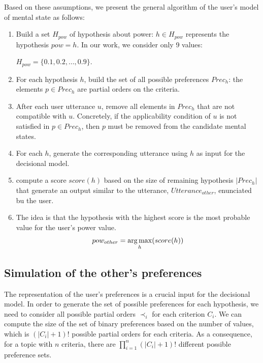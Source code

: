 \documentclass[conference, letterpaper]{IEEEtran}
\begin{document}
	Based on these assumptions, we present the general algorithm of the user's model of mental state as follows:
	\begin{enumerate}
		\item Build a set $H_{pow}$ of hypothesis about power: $h\in H_{pow}$ represents the hypothesis $pow=h$. In our work, we consider only 9 values: 
		
		$H_{pow}=\{0.1, 0.2, \ldots, 0.9\}$.
		\item For each hypothesis $h$, build the set of all possible preferences $Prec_h$: the elements $p\in Prec_h$ are partial orders on the criteria.
		\item After each user utterance $u$, remove all elements in $Prec_h$ that are not compatible with $u$. Concretely, if the applicability condition of $u$ is not satisfied in $p\in Prec_h$, then $p$ must be removed from the candidate mental states.
		\item For each $h$, generate the corresponding utterance using $h$ as input for the decisional model.
		\item compute a score $score(h)$ based on the size of remaining hypothesis $|Prec_h|$ that generate an output similar to the utterance, $Utterance_{other}$, enunciated bu the user. 
		\item 	The idea is that the hypothesis with the highest score is the most probable value for the user's power value.
		\vspace{-0.1 cm}
		\begin{equation}
		pow_{other} = \operatorname*{arg\,max}_{h} (score(h))
		\vspace{-0.15 cm}
		\end{equation}
		
	\end{enumerate}
	


	
	\subsection{Simulation of the other's preferences}
	
		The representation of the user's preferences is a crucial input for the decisional model. In order to generate the set of possible preferences for each hypothesis, we need to consider all possible partial orders $\prec_i$ for each criterion $C_i$. 
		We can compute the size of the set of binary preferences based on the number of values, which is $(|C_i| + 1)!$ possible partial orders for each criteria. As a consequence, for a topic with $n$ criteria, there are $\prod_{i=1}^n (|C_i|+1)!$ different possible preference sets.
	
\end{document}
